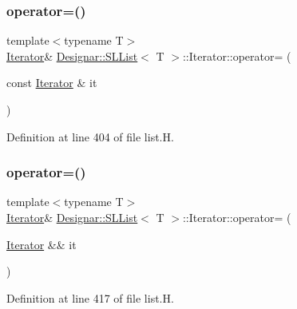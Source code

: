 \subsubsection{\texorpdfstring{operator=()}{operator=()}\hspace{0.1cm}{\footnotesize\ttfamily [1/2]}}
{\footnotesize\ttfamily template$<$typename T$>$ \\
\hyperlink{class_designar_1_1_s_l_list_1_1_iterator}{Iterator}\& \hyperlink{class_designar_1_1_s_l_list}{Designar\+::\+S\+L\+List}$<$ T $>$\+::Iterator\+::operator= (\begin{DoxyParamCaption}\item[{const \hyperlink{class_designar_1_1_s_l_list_1_1_iterator}{Iterator} \&}]{it }\end{DoxyParamCaption})\hspace{0.3cm}{\ttfamily [inline]}}



Definition at line 404 of file list.\+H.

\mbox{\label{class_designar_1_1_s_l_list_1_1_iterator_a9215becbdd87b11db7f6481e96df9343}} 
\subsubsection{\texorpdfstring{operator=()}{operator=()}\hspace{0.1cm}{\footnotesize\ttfamily [2/2]}}
{\footnotesize\ttfamily template$<$typename T$>$ \\
\hyperlink{class_designar_1_1_s_l_list_1_1_iterator}{Iterator}\& \hyperlink{class_designar_1_1_s_l_list}{Designar\+::\+S\+L\+List}$<$ T $>$\+::Iterator\+::operator= (\begin{DoxyParamCaption}\item[{\hyperlink{class_designar_1_1_s_l_list_1_1_iterator}{Iterator} \&\&}]{it }\end{DoxyParamCaption})\hspace{0.3cm}{\ttfamily [inline]}}



Definition at line 417 of file list.\+H.

\mbox{\label{class_designar_1_1_s_l_list_1_1_iterator_adb490da387d9628b7b61217247e96d97}} 
